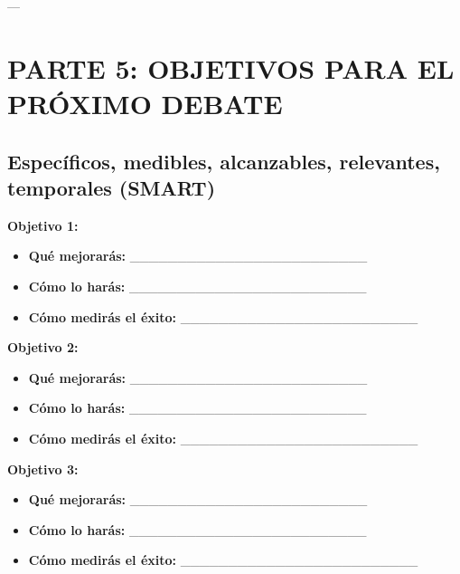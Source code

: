 \documentclass[a4paper,11pt]{article}
\begin{document}
---

\vspace{0.2cm}

\section{PARTE 5: OBJETIVOS PARA EL PRÓXIMO DEBATE}

\vspace{0.2cm}

\subsection{Específicos, medibles, alcanzables, relevantes, temporales (SMART)}

\vspace{0.2cm}

\textbf{Objetivo 1:}

\begin{itemize}

  \item \textbf{Qué mejorarás:} _________________________

  \item \textbf{Cómo lo harás:} _________________________

  \item \textbf{Cómo medirás el éxito:} _________________________

\end{itemize}

\vspace{0.2cm}

\textbf{Objetivo 2:}

\begin{itemize}

  \item \textbf{Qué mejorarás:} _________________________

  \item \textbf{Cómo lo harás:} _________________________

  \item \textbf{Cómo medirás el éxito:} _________________________

\end{itemize}

\vspace{0.2cm}

\textbf{Objetivo 3:}

\begin{itemize}

  \item \textbf{Qué mejorarás:} _________________________

  \item \textbf{Cómo lo harás:} _________________________

  \item \textbf{Cómo medirás el éxito:} _________________________

\end{itemize}
\end{document}

